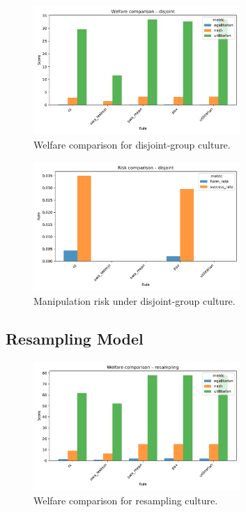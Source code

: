 \documentclass[11pt]{article}
\begin{document}
\begin{figure}[h!]
\centering
\includegraphics[width=0.7\textwidth]{figures/welfare_comparison_disjoint.pdf}
\caption{Welfare comparison for disjoint-group culture.}
\end{figure}

\begin{figure}[h!]
\centering
\includegraphics[width=0.7\textwidth]{figures/risk_comparison_disjoint.pdf}
\caption{Manipulation risk under disjoint-group culture.}
\end{figure}

\subsection{Resampling Model}

\begin{figure}[h!]
\centering
\includegraphics[width=0.7\textwidth]{figures/welfare_comparison_resampling.pdf}
\caption{Welfare comparison for resampling culture.}
\end{figure}
\end{document}
